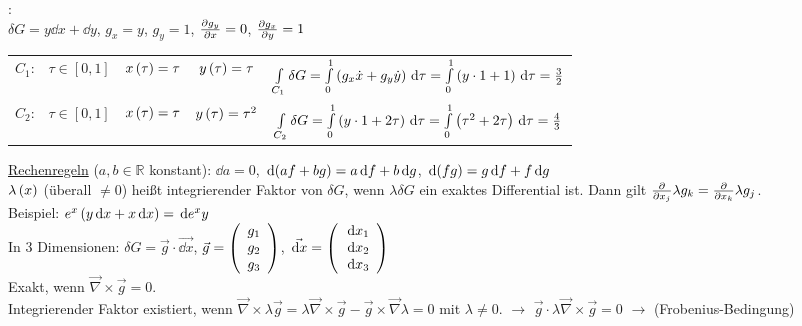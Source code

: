 :\\
$\delta G = y \dd{x} + \dd{y}$, $g_x = y$, $g_y = 1$, $\frac{\partial g_y}{\partial x} = 0$, $\frac{\partial g_x}{\partial y} = 1$
\begin{figure}[H]
  \centering
\end{figure}

\setlength{\tabcolsep}{5pt}
\renewcommand{\arraystretch}{1}
\begin{table}[H]
  \centering
  \begin{tabular}{c c c c c}
    $C_1$:&$\tau\in [0,1]$&$x\left( \tau \right) =\tau$&$y\left( \tau \right)=\tau$&$\int\limits_{C_1}\delta G = \int\limits_0^1 \left( g_x \dot{x} + g_y \dot{y} \right)\,\text d{\tau} = \int\limits_0^1 \left( y\cdot 1+1 \right)\,\text d{\tau} = \frac32$\\
    $C_2$:&$\tau\in [0,1]$&$x\left( \tau \right) = \tau$&$y\left( \tau \right) = \tau^2$&$\int\limits_{C_2}\delta G = \int\limits_0^1 \left( y\cdot 1 + 2\tau \right)\,\text d{\tau} = \int\limits_0^1\left( \tau^2+2\tau \right)\,\text d{\tau} = \frac43$
  \end{tabular}
\end{table}

\uline{Rechenregeln} ($a,b\in \mathds{R}$ konstant): $\dd{a} = 0$, $\,\text d{\left( a f + b g \right)} = a\,\text d{f} + b \,\text d{g}$, $\,\text d{\left( fg \right)} =g\,\text d{f} + f\,\text d{g}$\\
$\lambda\left( x \right)$ (überall $\neq 0$) heißt integrierender Faktor von $\delta G$, wenn $\lambda \delta G$ ein exaktes Differential ist. Dann gilt $\frac{\partial }{\partial x_j}\lambda g_k = \frac{\partial }{\partial x_k}\lambda g_j$.\\
Beispiel: $e^{x}\left( y \,\text d{x} + x\,\text d{x} \right) = \,\text d{e^x y}$\\
In $3$ Dimensionen: $\delta G = \vec{g}\cdot\vec{\dd{x}}$,
$\vec{g} = \left( \begin{array}{c} g_1\\g_2\\g_3\end{array} \right)$,
$\vec{\,\text d{x}} = \left( \begin{array}{c}\,\text d{x_1}\\ \,\text d{x_2}\\ \,\text d{x_3}\end{array} \right)$\\
Exakt, wenn $\vec{\nabla}\times \vec{g} = 0$.\\
Integrierender Faktor existiert, wenn $\vec{\nabla}\times \lambda \vec{g} = \lambda\vec{\nabla}\times \vec{g} - \vec{g}\times\vec{\nabla}\lambda = 0$ mit $\lambda \neq 0$. $\rightarrow$ $\vec{g}\cdot\lambda\vec{\nabla}\times\vec{g} = 0$ $\rightarrow$  (Frobenius-Bedingung)


